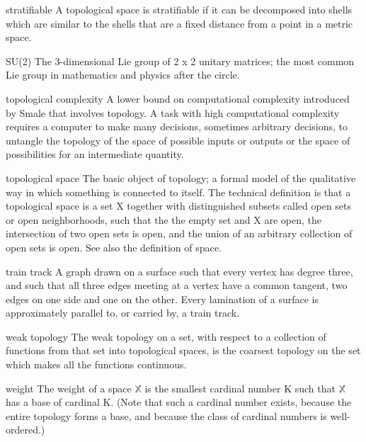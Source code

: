 \begin{description}
\begin{tiny}
\item[stratifiable] A topological space is stratifiable if it can be decomposed into shells which are similar to the shells that are a fixed distance from a point in a metric space.
\item[SU(2)] The 3-dimensional Lie group of 2 x 2 unitary matrices; the most common Lie group in mathematics and physics after the circle.
\item[topological complexity] A lower bound on computational complexity introduced by Smale that involves topology. A task with high computational complexity requires a computer to make many decisions, sometimes arbitrary decisions, to untangle the topology of the space of possible inputs or outputs or the space of possibilities for an intermediate quantity.
\item[topological space] The basic object of topology; a formal model of the qualitative way in which something is connected to itself. The technical definition is that a topological space is a set X together with distinguished subsets called open sets or open neighborhoods, such that the the empty set and X are open, the intersection of two open sets is open, and the union of an arbitrary collection of open sets is open. See also the definition of space.
\item[train track] A graph drawn on a surface such that every vertex has degree three, and such that all three edges meeting at a vertex have a common tangent, two edges on one side and one on the other. Every lamination of a surface is approximately parallel to, or carried by, a train track.
\item[weak topology] The weak topology on a set, with respect to a collection of functions from that set into topological spaces, is the coarsest topology on the set which makes all the functions continuous.
\item[weight] The weight of a space $\mathbb{X}$ is the smallest cardinal number $\mathrm{K}$ such that $\mathbb{X}$ has a base of cardinal $\mathrm{K}$. (Note that such a cardinal number exists, because the entire topology forms a base, and because the class of cardinal numbers is well-ordered.)

\end{tiny} 
\end{description}
